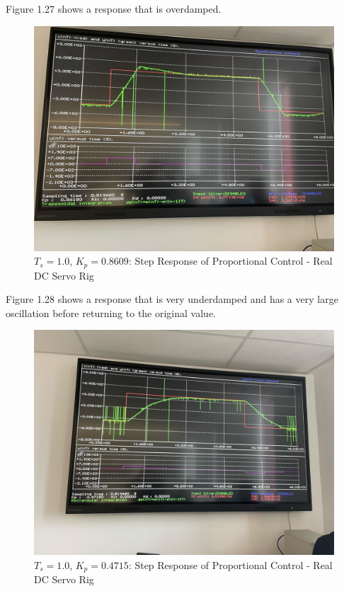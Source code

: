 \documentclass[stu, a4paper, 12pt, floatsintext]{apa7}
\numberwithin{figure}{section}
\numberwithin{table}{section}
\numberwithin{equation}{section}
\begin{document}
Figure 1.27 shows a response that is overdamped.
\begin{figure}[H]
    \caption{$T_s = 1.0$, $K_p = 0.8609$: Step Response of Proportional Control - Real DC Servo Rig}
    \label{fig:1.0_Ts_step4_step_response_1}
    \centering
    \includegraphics[width=1.1\textwidth]{pictures/task4_kp_1.0_1}
\end{figure}
Figure 1.28 shows a response that is very underdamped and has a very large oscillation before returning to the original value. 
\begin{figure}[H]
    \caption{$T_s = 1.0$, $K_p = 0.4715$: Step Response of Proportional Control - Real DC Servo Rig}
    \label{fig:1.0_Ts_step4_step_response_2}
    \centering
    \includegraphics[width=1.1\textwidth]{pictures/task4_kp_1.0_2}
\end{figure}
\end{document}
